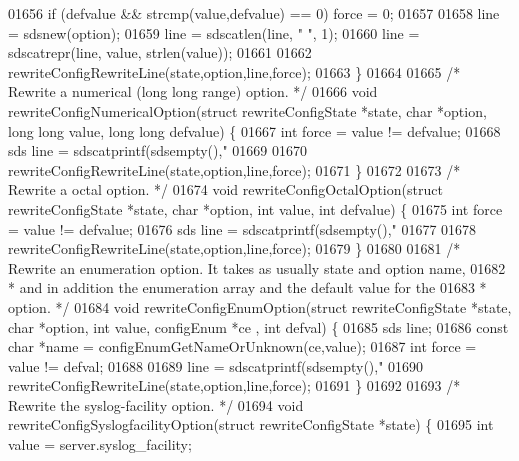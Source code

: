 \begin{DoxyCode}
{{{{{{{{{{{{{{{{{{{{01656     \textcolor{keywordflow}{if} (defvalue && strcmp(value,defvalue) == 0) force = 0;
01657 
01658     line = sdsnew(option);
01659     line = sdscatlen(line, \textcolor{stringliteral}{" "}, 1);
01660     line = sdscatrepr(line, value, strlen(value));
01661 
01662     rewriteConfigRewriteLine(state,option,line,force);
01663 \}
01664 
01665 \textcolor{comment}{/* Rewrite a numerical (long long range) option. */}
01666 \textcolor{keywordtype}{void} rewriteConfigNumericalOption(\textcolor{keyword}{struct} rewriteConfigState *state, \textcolor{keywordtype}{char} *option, \textcolor{keywordtype}{long} \textcolor{keywordtype}{long} value, \textcolor{keywordtype}{
      long} \textcolor{keywordtype}{long} defvalue) \{
01667     \textcolor{keywordtype}{int} force = value != defvalue;
01668     sds line = sdscatprintf(sdsempty(),\textcolor{stringliteral}{"%
01669 
01670     rewriteConfigRewriteLine(state,option,line,force);
01671 \}
01672 
01673 \textcolor{comment}{/* Rewrite a octal option. */}
01674 \textcolor{keywordtype}{void} rewriteConfigOctalOption(\textcolor{keyword}{struct} rewriteConfigState *state, \textcolor{keywordtype}{char} *option, \textcolor{keywordtype}{int} value, \textcolor{keywordtype}{int} defvalue)
       \{
01675     \textcolor{keywordtype}{int} force = value != defvalue;
01676     sds line = sdscatprintf(sdsempty(),\textcolor{stringliteral}{"%
01677 
01678     rewriteConfigRewriteLine(state,option,line,force);
01679 \}
01680 
01681 \textcolor{comment}{/* Rewrite an enumeration option. It takes as usually state and option name,}
01682 \textcolor{comment}{ * and in addition the enumeration array and the default value for the}
01683 \textcolor{comment}{ * option. */}
01684 \textcolor{keywordtype}{void} rewriteConfigEnumOption(\textcolor{keyword}{struct} rewriteConfigState *state, \textcolor{keywordtype}{char} *option, \textcolor{keywordtype}{int} value, configEnum *ce
      , \textcolor{keywordtype}{int} defval) \{
01685     sds line;
01686     \textcolor{keyword}{const} \textcolor{keywordtype}{char} *name = configEnumGetNameOrUnknown(ce,value);
01687     \textcolor{keywordtype}{int} force = value != defval;
01688 
01689     line = sdscatprintf(sdsempty(),\textcolor{stringliteral}{"%
01690     rewriteConfigRewriteLine(state,option,line,force);
01691 \}
01692 
01693 \textcolor{comment}{/* Rewrite the syslog-facility option. */}
01694 \textcolor{keywordtype}{void} rewriteConfigSyslogfacilityOption(\textcolor{keyword}{struct} rewriteConfigState *state) \{
01695     \textcolor{keywordtype}{int} value = server.syslog\_facility;
}}}}}}}}}}}}}}}}}}}}}}}
\end{DoxyCode}

